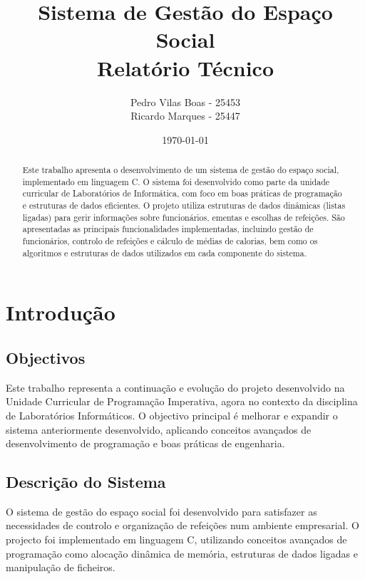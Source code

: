 \documentclass[a4paper,12pt]{report}
\begin{document}
\title{Sistema de Gestão do Espaço Social\\
       \large Relatório Técnico}
\author{Pedro Vilas Boas - 25453 \\ Ricardo Marques - 25447}
\date{\today}

\maketitle

\begin{abstract}
Este trabalho apresenta o desenvolvimento de um sistema de gestão do espaço social, implementado em linguagem C. O sistema foi desenvolvido como parte da unidade curricular de Laboratórios de Informática, com foco em boas práticas de programação e estruturas de dados eficientes. O projeto utiliza estruturas de dados dinâmicas (listas ligadas) para gerir informações sobre funcionários, ementas e escolhas de refeições. São apresentadas as principais funcionalidades implementadas, incluindo gestão de funcionários, controlo de refeições e cálculo de médias de calorias, bem como os algoritmos e estruturas de dados utilizados em cada componente do sistema.
\end{abstract}

\tableofcontents
\listoffigures
\listoftables

\chapter{Introdução}

\section{Objectivos}
Este trabalho representa a continuação e evolução do projeto desenvolvido na Unidade Curricular de Programação Imperativa, agora no contexto da disciplina de Laboratórios Informáticos. O objectivo principal é melhorar e expandir o sistema anteriormente desenvolvido, aplicando conceitos avançados de desenvolvimento de programação e boas práticas de engenharia.

\section{Descrição do Sistema}
O sistema de gestão do espaço social foi desenvolvido para satisfazer as necessidades de controlo e organização de refeições num ambiente empresarial. O projecto foi implementado em linguagem C, utilizando conceitos avançados de programação como alocação dinâmica de memória, estruturas de dados ligadas e manipulação de ficheiros.
\end{document}

